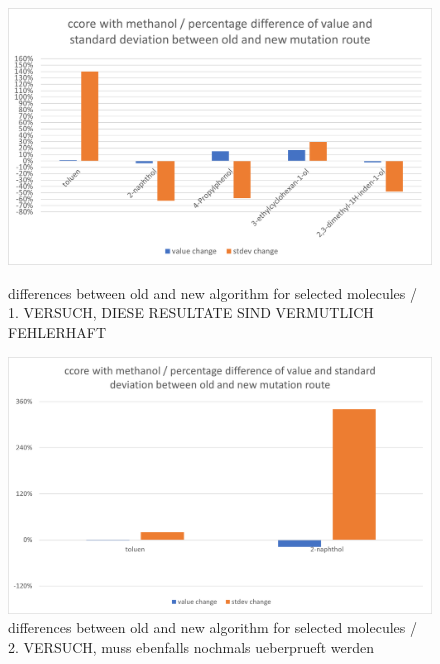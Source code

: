\begin{figure}[H]
	
	\includegraphics[scale=0.8]{molecules_v1_failed_barchart}
		
	
	{differences between old and new algorithm for selected molecules / 1. VERSUCH, DIESE RESULTATE SIND VERMUTLICH FEHLERHAFT}
	
	\includegraphics[scale=0.8]{2molecules_v2_barchart}
	
	
	\caption{differences between old and new algorithm for selected molecules / 2. VERSUCH, muss ebenfalls nochmals ueberprueft werden}
	
\end{figure}


